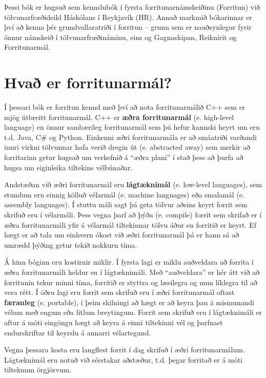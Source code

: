 Þessi bók er hugsuð sem kennslubók í fyrsta forritunarnámskeiðinu (Forritun) við tölvunarfræðideild Háskólans í Reykjavík (HR).
Annað markmið bókarinnar er því að kenna þér grundvallaratriði í forritun -- grunn sem er nauðsynlegur fyrir önnur námskeið í tölvunarfræðináminu, eins og Gagnaskipan, Reiknirit og Forritunarmál.

\section{Hvað er forritunarmál?}

Í þessari bók er forritun kennd með því að nota forritunarmálið C++ sem er mjög útbreitt forritunarmál.
C++ er {\bf æðra forritunarmál} (e. high-level language) en önnur sambærileg forritunarmál sem þú hefur kannski heyrt um eru t.d. Java, C{\#} og Python.
Einkenni æðri forritunarmála er að smáatriði varðandi innri virkni tölvunnar hafa verið dregin út (e. abstracted away) sem merkir að forritarinn getur hugsað um verkefnið á ``æðra plani'' í stað þess að þurfa að hugsa um eiginleika tiltekins vélbúnaðar.

Andstæðan við æðri forritunarmál eru {\bf lágtæknimál} (e. low-level languages), sem stundum eru einnig kölluð vélarmál (e. machine languages) eða smalamál (e. assembly languages).
Í stuttu máli sagt þá geta tölvur aðeins keyrt forrit sem skrifuð eru í vélarmáli.
Þess vegna þarf að þýða (e. compile) forrit sem skrifað er í æðra forritunarmáli yfir á vélarmál tiltekinnar tölvu áður en forritið er keyrt.
Ef hægt er að tala um einhvern ókost við æðri forritunarmál þá er hann sá að umrædd þýðing getur tekið nokkurn tíma.


Á hinn bóginn eru kostirnir miklir.
Í fyrsta lagi er miklu auðveldara að forrita í æðra forritunarmáli heldur en í lágtæknimáli.
Með ``auðveldara'' er hér átt við að forritunin tekur minni tíma, forritið er styttra og læsilegra og mun líklegra til að vera rétt.
Í öðru lagi eru forrit sem skrifuð eru í æðri forritunarmál oftast {\bf færanleg} (e. portable), í þeim skilningi að hægt er að keyra þau á mismunandi vélum með engum eða litlum breytingum.
Forrit sem skrifuð eru í lágtæknimáli er aftur á móti eingöngu hægt að keyra á einni tiltekinni vél og þarfnast endurskriftar til keyrslu á annarri vélartegund.

Vegna þessara kosta eru langflest forrit í dag skrifuð í æðri forritunarmálum.
Lágtæknimál eru notuð við sérstakar aðstæður, t.d. þegar forritað er á móti tilteknum örgjörvum.

